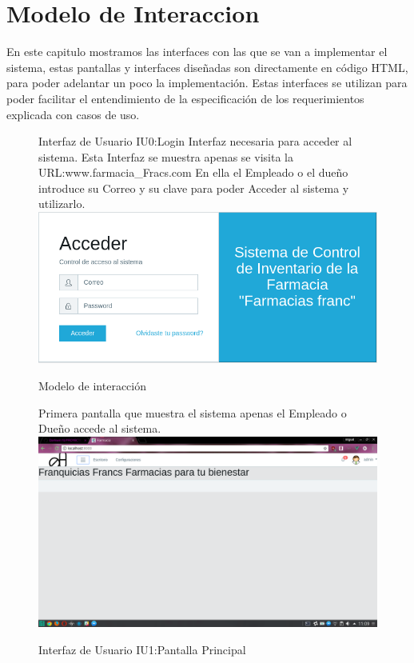 \chapter{Modelo de Interaccion}
 
En este capitulo mostramos las interfaces con las que se van a implementar el sistema, estas pantallas y interfaces diseñadas son directamente en código HTML, para poder adelantar un poco la implementación. 
Estas interfaces se utilizan para poder facilitar el entendimiento de la especificación de los requerimientos explicada con casos de uso.


\begin{figure}[htbp!]
	\begin{center}
	Interfaz de Usuario IU0:Login
	Interfaz necesaria para acceder al sistema.
	Esta Interfaz se muestra apenas se visita la URL:www.farmacia\_Fracs.com
	En ella el Empleado o el dueño introduce su Correo y su clave para poder			Acceder al sistema y utilizarlo.
		\includegraphics[width=\textwidth]{Pantallas/login}
		\caption{Modelo de interacción}
	\end{center}
\end{figure}



\begin{figure}[htbp!]
	\begin{center}
	
Primera pantalla que muestra el sistema apenas el Empleado o Dueño accede al sistema.
		\includegraphics[width=\textwidth]{Pantallas/PantallaPrincipal}
		\caption{Interfaz de Usuario IU1:Pantalla Principal}
	\end{center}
\end{figure}






